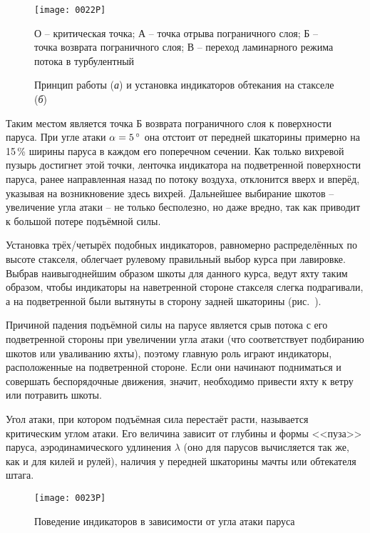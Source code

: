 \begin{figure*}[htb]
  \centering
  \texttt{[image: 0022P]}
  \caption{Принцип работы (\textit{а}) и установка индикаторов обтекания на стакселе (\textit{б})}
  \label{fig:22}
  \small
  \centering{}
  О \--- критическая точка; А \--- точка отрыва пограничного слоя; Б \--- точка возврата пограничного слоя; В \--- переход ламинарного режима потока в турбулентный
\end{figure*}

Таким местом является точка Б возврата пограничного слоя к поверхности паруса. При угле атаки $\alpha = 5\,^\circ$ она отстоит от передней шкаторины примерно на 15\,\% ширины паруса в каждом его поперечном сечении. Как только вихревой пузырь достигнет этой точки, ленточка индикатора на подветренной поверхности паруса, ранее направленная назад по потоку воздуха, отклонится вверх и вперёд, указывая на возникновение здесь вихрей. Дальнейшее выбирание шкотов \--- увеличение угла атаки \--- не только бесполезно, но даже вредно, так как приводит к большой потере подъёмной силы.

Установка трёх\-/четырёх подобных индикаторов, равномерно распределённых по высоте стакселя, облегчает рулевому правильный выбор курса при лавировке. Выбрав наивыгоднейшим образом шкоты для данного курса, ведут яхту таким образом, чтобы индикаторы на наветренной стороне стакселя слегка подрагивали, а на подветренной были вытянуты в сторону задней шкаторины (рис.~).
 
Причиной падения подъёмной силы на парусе является срыв потока с его подветренной стороны при увеличении угла атаки (что соответствует подбиранию шкотов или уваливанию яхты), поэтому главную роль играют индикаторы, расположенные на подветренной стороне. Если они начинают подниматься и совершать беспорядочные движения, значит, необходимо привести яхту к ветру или потравить шкоты.

Угол атаки, при котором подъёмная сила перестаёт расти, называется критическим углом атаки. Его величина зависит от глубины и формы <<пуза>> паруса, аэродинамического удлинения $\lambda$ (оно для парусов вычисляется так же, как и для килей и рулей), наличия у передней шкаторины мачты или обтекателя штага.

\begin{figure*}[htb]
  \centering
  \texttt{[image: 0023P]}
  \caption{Поведение индикаторов в зависимости от угла атаки паруса}
  \label{fig:23}
\end{figure*}

